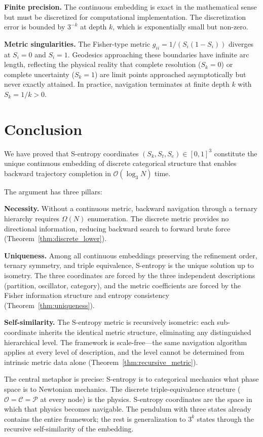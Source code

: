 \documentclass[12pt,twocolumn]{article}
\begin{document}
\textbf{Finite precision.} The continuous embedding is exact in the mathematical sense but must be discretized for computational implementation. The discretization error is bounded by $3^{-k}$ at depth $k$, which is exponentially small but non-zero.

\textbf{Metric singularities.} The Fisher-type metric $g_{ii} = 1/(S_i(1-S_i))$ diverges at $S_i = 0$ and $S_i = 1$. Geodesics approaching these boundaries have infinite arc length, reflecting the physical reality that complete resolution ($S_k = 0$) or complete uncertainty ($S_k = 1$) are limit points approached asymptotically but never exactly attained. In practice, navigation terminates at finite depth $k$ with $S_k = 1/k > 0$.


\section{Conclusion}
\label{sec:conclusion}

We have proved that S-entropy coordinates $(S_k, S_t, S_e) \in [0,1]^3$ constitute the unique continuous embedding of discrete categorical structure that enables backward trajectory completion in $\mathcal{O}(\log_3 N)$ time.

The argument has three pillars:

\textbf{Necessity.} Without a continuous metric, backward navigation through a ternary hierarchy requires $\Omega(N)$ enumeration. The discrete metric provides no directional information, reducing backward search to forward brute force (Theorem~\ref{thm:discrete_lower}).

\textbf{Uniqueness.} Among all continuous embeddings preserving the refinement order, ternary symmetry, and triple equivalence, S-entropy is the unique solution up to isometry. The three coordinates are forced by the three independent descriptions (partition, oscillator, category), and the metric coefficients are forced by the Fisher information structure and entropy consistency (Theorem~\ref{thm:uniqueness}).

\textbf{Self-similarity.} The S-entropy metric is recursively isometric: each sub-coordinate inherits the identical metric structure, eliminating any distinguished hierarchical level. The framework is scale-free---the same navigation algorithm applies at every level of description, and the level cannot be determined from intrinsic metric data alone (Theorem~\ref{thm:recursive_metric}).

The central metaphor is precise: S-entropy is to categorical mechanics what phase space is to Newtonian mechanics. The discrete triple-equivalence structure ($\mathcal{O} = \mathcal{C} = \mathcal{P}$ at every node) is the physics. S-entropy coordinates are the space in which that physics becomes navigable. The pendulum with three states already contains the entire framework; the rest is generalization to $3^k$ states through the recursive self-similarity of the embedding.



\end{document}
